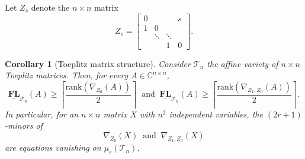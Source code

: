 \documentclass[reqno]{amsart}
\newtheorem{corollary}[theorem]{Corollary}
\theoremstyle{definition}
\newcommand{\rank}{\mathrm{rank}}
\numberwithin{equation}{section}
\begin{document}
Let $Z_s$ denote the $n \times n$ matrix
\begin{equation*}
    Z_s=\begin{bmatrix}
            0 & & &s\\
            1 & 0 & & \\
            & \ddots & \ddots & \\
            & & 1 & 0
        \end{bmatrix}.
\end{equation*}

\begin{corollary}[Toeplitz matrix structure]\label{cor:displacement rank of Toeplitz}
    Consider $\mathcal{T}_n$ the affine variety of $n \times n $ Toeplitz matrices. Then, for every $A \in \mathbb{C}^{n \times n}$, 
    \begin{equation*}
        \underline{\mathbf{FL}}_{\mathcal{T}_n}(A) \geq \left\lceil \frac{\rank(\nabla_{Z_0}(A))}{2} \right\rceil~\text{ and }~\underline{\mathbf{FL}}_{\mathcal{T}_n}(A) \geq \left\lceil \frac{\rank(\nabla_{Z_1,Z_0}(A))}{2} \right\rceil.
    \end{equation*}
    In particular, for an $n \times n$ matrix $X$ with $n^2$ independent variables, the $(2r+1)$-minors of 
    \begin{equation*}
        \nabla_{Z_0}(X)~\text{ and }~\nabla_{Z_1,Z_0}(X)
    \end{equation*}
    are equations vanishing on $\mu_r(\mathcal{T}_n)$.
\end{corollary}
\end{document}
